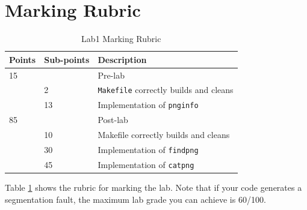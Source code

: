 \section{Marking Rubric}
\begin{table}[ht]
\begin{center}
\begin{tabular}{|p{2cm}|p{2cm}|p{9cm}|}
\hline
Points & Sub-points &Description  \\ \hline
15     &   & Pre-lab      \\ \hline
       & 2 & \verb+Makefile+ correctly builds and cleans \\ \hline
       & 13& Implementation of \verb+pnginfo+ \\ \hline
85     &        & Post-lab \\ \hline
       & 10     & Makefile correctly builds and cleans \\ \hline
       & 30     & Implementation of \verb+findpng+  \\ \hline
       & 45     & Implementation of \verb+catpng+ \\ \hline
\end{tabular}
\caption{Lab1 Marking Rubric}
\label{tb_lab1_rubric}
\end{center}
\end{table}

Table \ref{tb_lab1_rubric} shows the rubric for marking the lab. Note that if your code generates a segmentation fault, the maximum lab grade you can achieve is 60/100.

